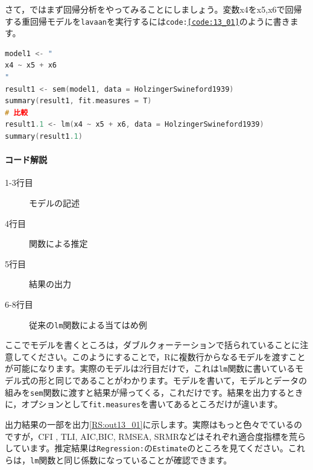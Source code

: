 \documentclass{ltjsbook}
\begin{document}
さて，ではまず回帰分析をやってみることにしましょう。変数x4をx5,x6で回帰する重回帰モデルを\texttt{lavaan}を実行するには\texttt{code:\ref{code:13_01}}のように書きます。

\begin{lstlisting}[language=c++,label={code:13_01},caption={重回帰モデル}]
model1 <- "
x4 ~ x5 + x6
"
result1 <- sem(model1, data = HolzingerSwineford1939)
summary(result1, fit.measures = T)
# 比較
result1.1 <- lm(x4 ~ x5 + x6, data = HolzingerSwineford1939)
summary(result1.1)
\end{lstlisting}

\paragraph{コード解説}
\begin{description}
	\item[1-3行目] モデルの記述
	\item[4行目] 関数による推定
	\item[5行目] 結果の出力
	\item[6-8行目] 従来の\texttt{lm}関数による当てはめ例
\end{description}

ここでモデルを書くところは，ダブルクォーテーションで括られていることに注意してください。このようにすることで，Rに複数行からなるモデルを渡すことが可能になります。実際のモデルは2行目だけで，これは\texttt{lm}関数に書いているモデル式の形と同じであることがわかります。モデルを書いて，モデルとデータの組みを\texttt{sem}関数に渡すと結果が帰ってくる，これだけです。結果を出力するときに，オプションとして\texttt{fit.measures}を書いてあるところだけが違います。

出力結果の一部を出力\ref{RS:out13_01}に示します。実際はもっと色々でているのですが，CFI , TLI, AIC,BIC, RMSEA, SRMRなどはそれぞれ適合度指標を荒らしています。推定結果は\texttt{Regression:}の\texttt{Estimate}のところを見てください。これらは，\texttt{lm}関数と同じ係数になっていることが確認できます。
\end{document}
